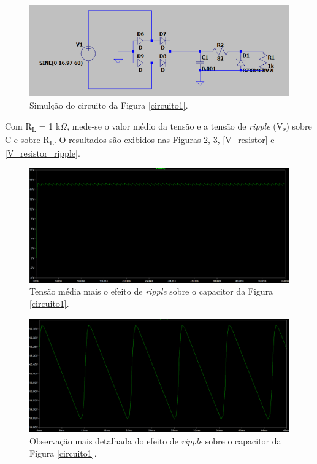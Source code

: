 \documentclass[journal, a4paper]{IEEEtran}
\begin{document}
    \begin{figure}[H]
		\begin{center}
		\includegraphics[width=\columnwidth]{Simulacao1.PNG}
		\caption{Simulção do circuito da Figura \ref{circuito1}.}
		\label{simulação1}
		\end{center}
	\end{figure}  

	Com R\textsubscript{L} = 1 k$\Omega$, mede-se o valor médio da tensão e a tensão de \textit{ripple} (V\textsubscript{$r$}) sobre C e sobre R\textsubscript{L}. O resultados são exibidos nas Figuras \ref{V_capacitor}, \ref{V_capacitor_ripple}, \ref{V_resistor} e \ref{V_resistor_ripple}.
    
     \begin{figure}[H]
		\begin{center}
		\includegraphics[width=\columnwidth]{circuito1_tensao_capacitor_1.PNG}
		\caption{Tensão média mais o efeito de \textit{ripple} sobre o capacitor da Figura \ref{circuito1}.}
		\label{V_capacitor}
		\end{center}
	\end{figure}
    
     \begin{figure}[H]
		\begin{center}
		\includegraphics[width=\columnwidth]{circuito1_tensao_capacitor_2.PNG}
		\caption{Observação mais detalhada do efeito de \textit{ripple} sobre o capacitor da Figura \ref{circuito1}.}
		\label{V_capacitor_ripple}
		\end{center}
	\end{figure}
    
\end{document}
